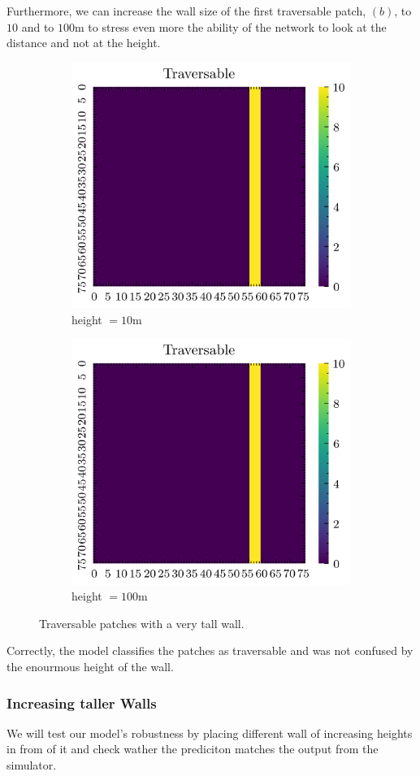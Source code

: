 \documentclass[../document.tex]{subfiles}
\begin{document}
Furthermore, we can increase the wall size of the first traversable patch, $(b)$, to $10$ and to $100$m to stress even more the ability of the network to look at the distance and not at the height.

\begin{figure}[H]
    \centering
    \begin{subfigure}[b]{0.33\textwidth}
        \includegraphics[width=\linewidth]{../img/5/custom_patches/walls_front/big-1-2d.png}
    \caption{height $=10$m}
    \end{subfigure}   
    \begin{subfigure}[b]{0.33\textwidth}
        \includegraphics[width=\linewidth]{../img/5/custom_patches/walls_front/big-1-2d.png}
        \caption{height $=100$m}
    \end{subfigure}   
\caption{Traversable patches with a very tall wall.}    
\end{figure}
Correctly, the model classifies the patches as traversable and was not confused by the enourmous height of the wall.

\subsubsection{Increasing taller Walls}
We will test our model's robustness by placing different wall of increasing heights in from of it and check wather the prediciton matches the output from the simulator. 
\end{document}
